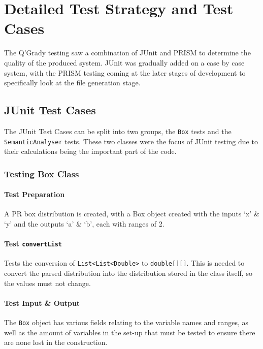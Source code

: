\documentclass[report.tex]{subfiles}
\begin{document}
\chapter{Detailed Test Strategy and Test Cases} %
\label{cha:detailed_test_strategy_and_test_cases}
The Q'Grady testing saw a combination of JUnit and PRISM to determine the
quality of the produced system. JUnit was gradually added on a case by case
system, with the PRISM testing coming at the later stages of development to
specifically look at the file generation stage.

\section{JUnit Test Cases} %
\label{sec:junit_test_cases}
The JUnit Test Cases can be split into two groups, the \texttt{Box} tests and
the \texttt{SemanticAnalyser} tests. These two classes were the focus of JUnit
testing due to their calculations being the important part of the code.

\subsection{Testing Box Class} %
\label{sub:testing_box_class}
\subsubsection{Test Preparation} %
\label{ssub:test_preparation}
A PR box distribution is created, with a Box object created with the inputs
`x' \& `y' and the outputs `a' \& `b', each with ranges of 2.

\subsubsection{Test \texttt{convertList}} %
\label{ssub:test_list_conversion}
Tests the conversion of \texttt{List<List<Double>} to \texttt{double[][]}. This
is needed to convert the parsed distribution into the distribution stored in the
class itself,  so the values must not change.

\subsubsection{Test Input \& Output} %
\label{ssub:test_input_output}
The \texttt{Box} object has various fields relating to the variable names and
ranges, as well as the amount of variables in the set-up that must be tested to
ensure there are none lost in the construction.
\end{document}
